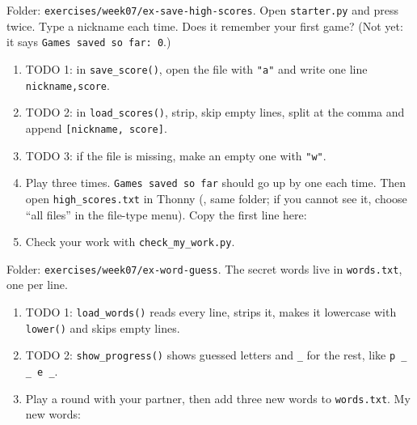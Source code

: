 \begin{exercise}
Folder: \texttt{exercises/week07/ex-save-high-scores}. Open \texttt{starter.py} and press  twice. Type a nickname each time.
Does it remember your first game? (Not yet: it says \texttt{Games saved so far: 0}.)
\begin{enumerate}[leftmargin=1.4em]
  \item TODO 1: in \texttt{save\_score()}, open the file with \texttt{"a"} and write one line \texttt{nickname,score}.
  \item TODO 2: in \texttt{load\_scores()}, strip, skip empty lines, split at the comma and append \texttt{[nickname, score]}.
  \item TODO 3: if the file is missing, make an empty one with \texttt{"w"}.
  \item Play three times. \texttt{Games saved so far} should go up by one each time. Then open \texttt{high\_scores.txt} in Thonny
        (, same folder; if you cannot see it, choose \enquote{all files} in the file-type menu). Copy the first line here:
  \item Check your work with \texttt{check\_my\_work.py}.
\end{enumerate}
\end{exercise}

\begin{exercise}
Folder: \texttt{exercises/week07/ex-word-guess}. The secret words live in \texttt{words.txt}, one per line.
\begin{enumerate}[leftmargin=1.4em]
  \item TODO 1: \texttt{load\_words()} reads every line, strips it, makes it lowercase with \texttt{lower()} and skips empty lines.
  \item TODO 2: \texttt{show\_progress()} shows guessed letters and \texttt{\_} for the rest, like \texttt{p \_ \_ e \_}.
  \item Play a round with your partner, then add three new words to \texttt{words.txt}. My new words:
\end{enumerate}
\end{exercise}


